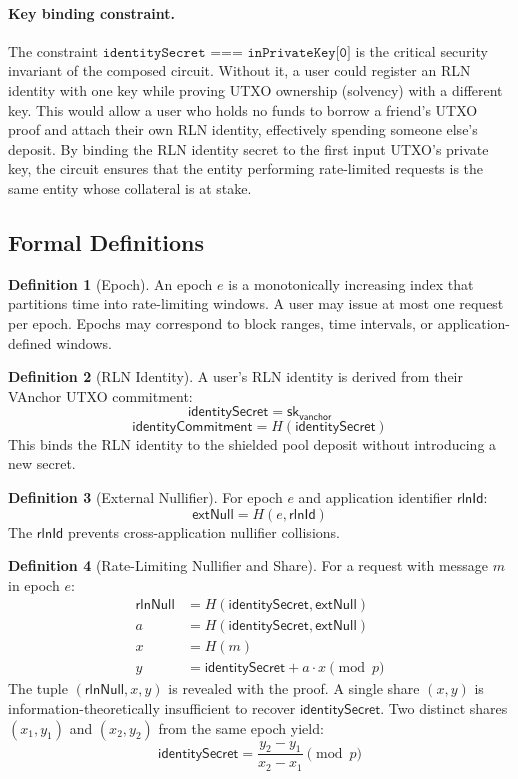 \documentclass[11pt,a4paper]{article}
\theoremstyle{definition}
\newtheorem{definition}{Definition}
\begin{document}
\paragraph{Key binding constraint.}
The constraint $\texttt{identitySecret === inPrivateKey[0]}$ is the critical security invariant of the composed circuit. Without it, a user could register an RLN identity with one key while proving UTXO ownership (solvency) with a different key. This would allow a user who holds no funds to borrow a friend's UTXO proof and attach their own RLN identity, effectively spending someone else's deposit. By binding the RLN identity secret to the first input UTXO's private key, the circuit ensures that the entity performing rate-limited requests is the same entity whose collateral is at stake.

\subsection{Formal Definitions}

\begin{definition}[Epoch]
An epoch $e$ is a monotonically increasing index that partitions time into rate-limiting windows. A user may issue at most one request per epoch. Epochs may correspond to block ranges, time intervals, or application-defined windows.
\end{definition}

\begin{definition}[RLN Identity]
A user's RLN identity is derived from their VAnchor UTXO commitment:
$$\mathsf{identitySecret} = \mathsf{sk}_{\mathsf{vanchor}}$$
$$\mathsf{identityCommitment} = H(\mathsf{identitySecret})$$
This binds the RLN identity to the shielded pool deposit without introducing a new secret.
\end{definition}

\begin{definition}[External Nullifier]
For epoch $e$ and application identifier $\mathsf{rlnId}$:
$$\mathsf{extNull} = H(e, \mathsf{rlnId})$$
The $\mathsf{rlnId}$ prevents cross-application nullifier collisions.
\end{definition}

\begin{definition}[Rate-Limiting Nullifier and Share]
For a request with message $m$ in epoch $e$:
\begin{align}
  \mathsf{rlnNull} &= H(\mathsf{identitySecret}, \mathsf{extNull}) \\
  a &= H(\mathsf{identitySecret}, \mathsf{extNull}) \\
  x &= H(m) \\
  y &= \mathsf{identitySecret} + a \cdot x \pmod{p}
\end{align}
The tuple $(\mathsf{rlnNull}, x, y)$ is revealed with the proof. A single share $(x, y)$ is information-theoretically insufficient to recover $\mathsf{identitySecret}$. Two distinct shares $(x_1, y_1)$ and $(x_2, y_2)$ from the same epoch yield:
$$\mathsf{identitySecret} = \frac{y_2 - y_1}{x_2 - x_1} \pmod{p}$$
\end{definition}
\end{document}
